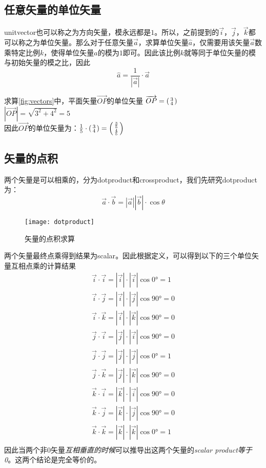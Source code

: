 \subsection*{任意矢量的单位矢量}
\gls{unitvector}也可以称之为方向矢量，模永远都是$1$。所以，之前提到的$\vec{i}$，$\vec{j}$，$\vec{k}$都可以称之为单位矢量。那么对于任意矢量$\vec{a}$，求算单位矢量$\hat{a}$，仅需要用该矢量$\vec{a}$数乘特定比例$k$，使得单位矢量$\hat{a}$的模为$1$即可。因此该比例$k$就等同于单位矢量的模与初始矢量的模之比，因此
\[
	\hat{a}= \frac{1}{|\vec{a}|} \cdot \vec{a}
\]
\begin{ExampleBox}
求算\ref{fig:vectors}中，平面矢量$\overrightarrow{OP}$的单位矢量
\tcblower
$\overrightarrow{OP}=\left(\begin{smallmatrix}3\\4\end{smallmatrix}\right)$\\
$|\overrightarrow{OP}|=\sqrt{3^2+4^2}=5$\\
因此$\overrightarrow{OP}$的单位矢量为：$\frac{1}{5} \cdot \left(\begin{smallmatrix}3\\4\end{smallmatrix}\right)=\left(\begin{smallmatrix}\frac{3}{5}\\\frac{4}{5}\end{smallmatrix}\right)$
\end{ExampleBox}

\subsection*{矢量的点积}
\label{subsec:Scalar Product}
两个矢量是可以相乘的，分为\gls{dotproduct}和\gls{crossproduct}，我们先研究\gls{dotproduct}为：
\[
	\vec{a}\cdot \vec{b}=|\vec{a}||\vec{b}|\cdot \cos{\theta}
\]

\begin{figure}[H]
\centering
\texttt{[image: dotproduct]}
\caption{矢量的点积求算}
\end{figure}

两个矢量最终点乘得到结果为\gls{scalar}。因此根据定义，可以得到以下的三个单位矢量互相点乘的计算结果
\begin{align*}
\vec{i}\cdot\vec{i}=|\vec{i}|\cdot|\vec{i}|\cos{0\si{\degree}} =1 \\
\vec{i}\cdot\vec{j}=|\vec{i}|\cdot|\vec{j}|\cos{90\si{\degree}} =0 \\
\vec{i}\cdot\vec{k}=|\vec{i}|\cdot|\vec{k}|\cos{90\si{\degree}} =0 \\
\vec{j}\cdot\vec{i}=|\vec{j}|\cdot|\vec{i}|\cos{90\si{\degree}} =0 \\
\vec{j}\cdot\vec{j}=|\vec{j}|\cdot|\vec{j}|\cos{0\si{\degree}} =1 \\
\vec{j}\cdot\vec{k}=|\vec{j}|\cdot|\vec{k}|\cos{90\si{\degree}} =0 \\
\vec{k}\cdot\vec{i}=|\vec{k}|\cdot|\vec{i}|\cos{90\si{\degree}} =0 \\
\vec{k}\cdot\vec{j}=|\vec{k}|\cdot|\vec{j}|\cos{90\si{\degree}} =0 \\
\vec{k}\cdot\vec{k}=|\vec{k}|\cdot|\vec{k}|\cos{0\si{\degree}} =1 \\
\end{align*}
因此当两个非0矢量\emph{互相垂直的时候}可以推导出这两个矢量的\emph{scalar product等于0}。这两个结论是完全等价的。

